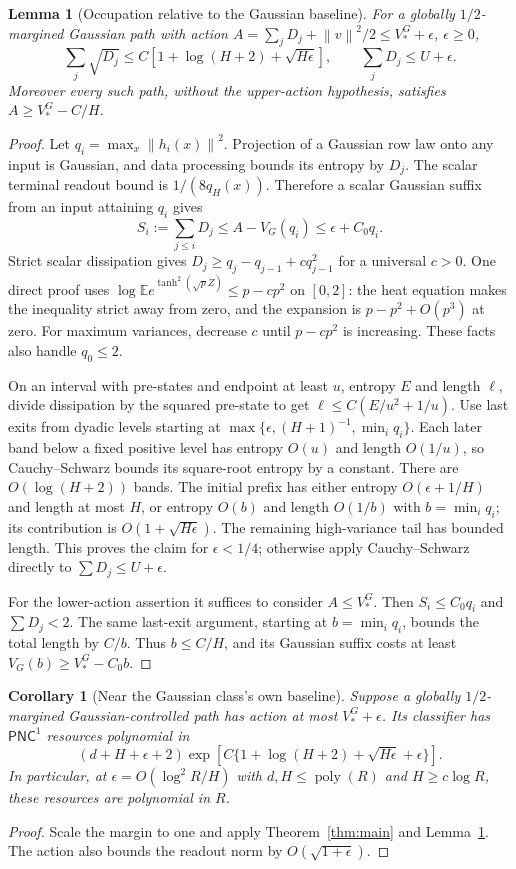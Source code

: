 \documentclass[11pt]{article}
\newtheorem{lemma}[theorem]{Lemma}
\newtheorem{corollary}[theorem]{Corollary}
\theoremstyle{remark}\newtheorem{remark}[theorem]{Remark}
\newcommand{\E}{\mathbb E}
\newcommand{\poly}{\operatorname{poly}}
\newcommand{\PNC}{\mathsf{PNC}}
\newcommand{\norm}[1]{\left\lVert #1\right\rVert}
\begin{document}
\begin{lemma}[Occupation relative to the Gaussian baseline]
\label{lem:gaussianoccupation}
For a globally $1/2$-margined Gaussian path with action
$A=\sum_jD_j+\norm v^2/2\le V_*^G+\epsilon$, $\epsilon\ge0$,
\[
 \sum_j\sqrt{D_j}\le C[1+\log(H+2)+\sqrt{H\epsilon}],
 \qquad \sum_jD_j\le U+\epsilon.
\]
Moreover every such path, without the upper-action hypothesis, satisfies
$A\ge V_*^G-C/H$.
\end{lemma}
\begin{proof}
Let $q_i=\max_x\norm{h_i(x)}^2$. Projection of a Gaussian row law
onto any input is Gaussian, and data processing bounds its entropy by
$D_j$. The scalar terminal readout bound is $1/(8q_H(x))$.
Therefore a scalar Gaussian suffix from an input attaining $q_i$ gives
\[
 S_i:=\sum_{j\le i}D_j\le A-V_G(q_i)\le\epsilon+C_0q_i.
\]
Strict scalar dissipation gives
$D_j\ge q_j-q_{j-1}+cq_{j-1}^2$ for a universal $c>0$.
One direct proof uses
$\log\E e^{\tanh^2(\sqrt pZ)}\le p-cp^2$ on $[0,2]$:
the heat equation makes the inequality strict away from zero, and the
expansion is $p-p^2+O(p^3)$ at zero. For maximum variances, decrease
$c$ until $p-cp^2$ is increasing. These facts also handle $q_0\le2$.

On an interval with pre-states and endpoint at least $u$, entropy $E$
and length $\ell$, divide dissipation by the squared pre-state to get
$\ell\le C(E/u^2+1/u)$. Use last exits from dyadic levels starting
at $\max\{\epsilon,(H+1)^{-1},\min_iq_i\}$. Each later band below
a fixed positive level has entropy $O(u)$ and length $O(1/u)$, so
Cauchy--Schwarz bounds its square-root entropy by a constant.
There are $O(\log(H+2))$ bands. The initial prefix has either entropy
$O(\epsilon+1/H)$ and length at most $H$, or entropy $O(b)$ and
length $O(1/b)$ with $b=\min_iq_i$; its contribution is
$O(1+\sqrt{H\epsilon})$. The remaining high-variance tail has bounded
length. This proves the claim for $\epsilon<1/4$; otherwise apply
Cauchy--Schwarz directly to $\sum D_j\le U+\epsilon$.

For the lower-action assertion it suffices to consider $A\le V_*^G$.
Then $S_i\le C_0q_i$ and $\sum D_j<2$. The same last-exit argument,
starting at $b=\min_iq_i$, bounds the total length by $C/b$.
Thus $b\le C/H$, and its Gaussian suffix costs at least
$V_G(b)\ge V_*^G-C_0b$.
\end{proof}

\begin{corollary}[Near the Gaussian class's own baseline]
\label{cor:critical}
Suppose a globally $1/2$-margined Gaussian-controlled path has action
at most $V_*^G+\epsilon$. Its classifier has $\PNC^1$ resources
polynomial in
\[
 (d+H+\epsilon+2)
 \exp\!\left[C\{1+\log(H+2)+\sqrt{H\epsilon}+\epsilon\}\right].
\]
In particular, at $\epsilon=O(\log^2 R/H)$ with
$d,H\le\poly(R)$ and $H\ge c\log R$, these resources are polynomial
in $R$.
\end{corollary}
\begin{proof}
Scale the margin to one and apply Theorem~\ref{thm:main} and
Lemma~\ref{lem:gaussianoccupation}. The action also bounds the
readout norm by $O(\sqrt{1+\epsilon})$.
\end{proof}
\end{document}
